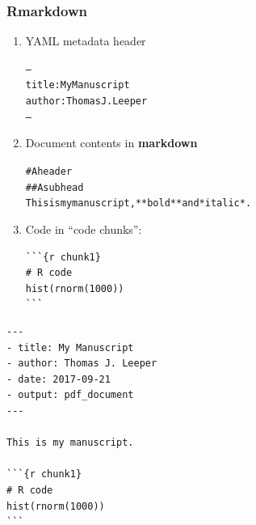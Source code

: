 \documentclass[14pt]{beamer}
\begin{document}
\begin{frame}[fragile]

\frametitle{Rmarkdown}

\begin{enumerate}\itemsep1em
\item YAML metadata header

\begin{alltt}\footnotesize
---
title: My Manuscript
author: Thomas J. Leeper
---
\end{alltt}


\item Document contents in \textbf{markdown}

\begin{alltt}\footnotesize
\# A header
\#\# A subhead
This is my manuscript, **bold** and *italic*.
\end{alltt}


\item Code in ``code chunks'':

\footnotesize
\begin{verbatim}
```{r chunk1}
# R code
hist(rnorm(1000))
```
\end{verbatim}
\end{enumerate}

\end{frame}


\begin{frame}[fragile]
\begin{verbatim}
---
- title: My Manuscript
- author: Thomas J. Leeper
- date: 2017-09-21
- output: pdf_document
---

This is my manuscript.

```{r chunk1}
# R code
hist(rnorm(1000))
```
\end{verbatim}
\end{frame}


\end{document}
